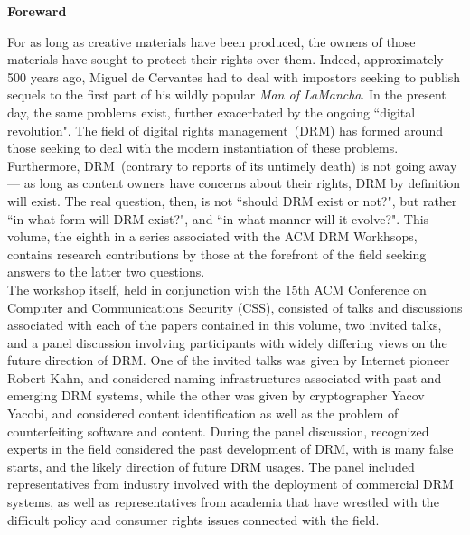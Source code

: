 \documentclass[11pt]{article}
\begin{document}
\begin{center}
{\bf\Large Foreward}
\end{center}

\noindent
For as long as creative materials have been produced, the owners of those materials have sought to protect their rights over them. Indeed, approximately 500 years ago, Miguel de Cervantes had to deal with impostors seeking to publish sequels to the first part of his wildly popular {\it Man of LaMancha}.  In the present day, the same problems exist, further exacerbated by the ongoing ``digital revolution". The field of digital rights management~(DRM) has formed around those seeking to deal with the modern instantiation of these problems. Furthermore, DRM~(contrary to reports of its untimely death) is not going away --- as long as content owners have concerns about their rights, DRM by definition will exist. The real question, then, is not ``should DRM exist or not?", but rather ``in what form will DRM exist?", and ``in what manner will it evolve?". This volume, the eighth in a series associated with the ACM DRM Workhsops, contains research contributions by those at the forefront of the field seeking answers to the latter two questions.~\\

The workshop itself, held in conjunction with the 15th ACM Conference on Computer and Communications Security (CSS), consisted of talks and discussions associated with each of the papers contained in this volume, two invited talks, and a panel discussion involving participants with widely differing views on the future direction of DRM. One of the invited talks was given by Internet pioneer Robert Kahn, and considered naming infrastructures associated with past and emerging DRM systems, while the other was given by cryptographer Yacov Yacobi, and considered content identification as well as the problem of counterfeiting software and content.  During the panel discussion, recognized experts in the field considered the past development of DRM, with is many false starts, and the likely direction of future DRM usages.  The panel included representatives from industry involved with the deployment of commercial DRM systems, as well as representatives from academia that have wrestled with the difficult policy and consumer rights issues connected with the field.
~\\
\end{document}
